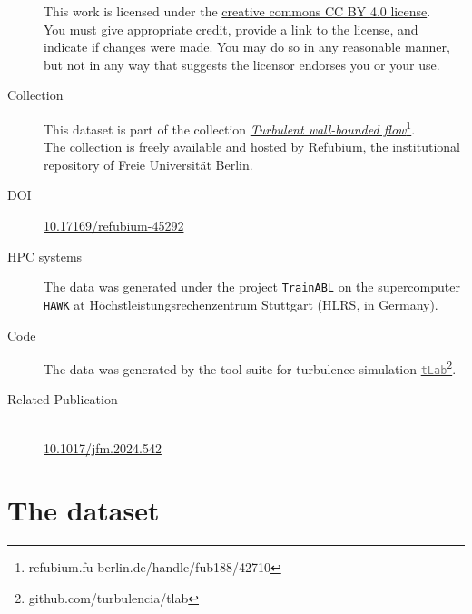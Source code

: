 \documentclass[11pt]{article}
\newcommand{\doi}{10.17169/refubium-45292}
\newcommand{\tlabName}{\textcolor{gray}{\texttt{tLab}}}
\newcommand{\printdoi}[1]{\href{https://dx.doi.org/#1}{#1}}
\newcommand{\light}[1]{\textcolor{black!80}{#1}}
\begin{document}
\begin{description}

    \sffamily

\item[\textcopyright] This work is licensed under the \href{https://creativecommons.org/licenses/by/4.0}{creative commons CC BY 4.0 license}. \\ 
{\small\light{You must give appropriate credit, provide a link to the license, and indicate if changes were made. You may do so in any reasonable manner, but not in any way that suggests the licensor endorses you or your use. }}

\item[\sffamily Collection] This dataset is part of the collection \href{https://refubium.fu-berlin.de/handle/fub188/42710}{\emph{Turbulent wall-bounded flow}\footnote{\url{refubium.fu-berlin.de/handle/fub188/42710}}}. \\ 
{\small \light{The collection is freely available and hosted by Refubium, the  institutional repository of Freie Universit\"at Berlin.}}

\item[\sffamily DOI]\printdoi{\doi}

\item[\sffamily HPC systems] The data was generated under the project \texttt{TrainABL} on the supercomputer \texttt{HAWK} at Höchstleistungsrechenzentrum Stuttgart (HLRS, in Germany). 

\item[\sffamily Code] The data was generated by the tool-suite for turbulence simulation \href{https://github.com/turbulencia/tlab}{\tlabName\footnote{\url{github.com/turbulencia/tlab}}}.

\item[\sffamily Related Publication] \phantom{A}~\\
    \printdoi{10.1017/jfm.2024.542}\\

\end{description}

\section{The dataset}
\end{document}
